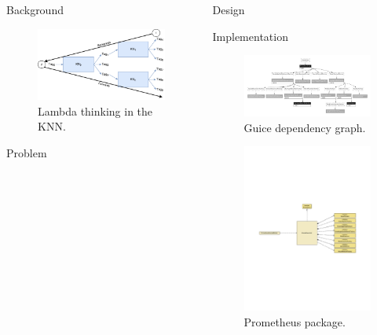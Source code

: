 \documentclass[final]{beamer} %
\begin{document}
\begin{columns}
\begin{column}{.3\textwidth}
\begin{block}{Background}
				\begin{figure}[!htb]
					\includegraphics[width=0.5\columnwidth]{figures/lambda_thinking.pdf}
					\caption{Lambda thinking in the KNN.}
					\label{think_lambda}
				\end{figure}
			\end{block}
			\begin{block}{Problem}
			\end{block}
	\end{column}
	\begin{column}{.35\textwidth}
		\begin{block}{Design}
		\end{block}
		\begin{block}{Implementation}
		\begin{figure}[!htb]
			\centering
			\includegraphics[width=0.5\columnwidth]{figures/guice_graph.pdf}
			\caption
			{Guice dependency graph.}
		\end{figure}
	
		\begin{figure}[!htb]
			\centering
			\includegraphics[width=0.5\columnwidth]{figures/prometheus_uml.pdf}
			\caption
			{Prometheus package.}
		\end{figure}
	

\end{block}
\end{column}
\end{columns}
\end{document}
